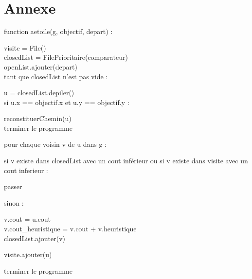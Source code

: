 \documentclass[a4paper, 11pt]{report}
\begin{document}
\newpage
\section*{Annexe}
function aetoile(g, objectif, depart) :
\begin{indented}[1.5cm]
    visite = File()\\
    closedList = FilePrioritaire(comparateur) \\
    openList.ajouter(depart) \\
    tant que closedList n'est pas vide :
    \begin{indented}[1.5cm]
        u = closedList.depiler()\\
        si u.x == objectif.x et u.y == objectif.y :
        \begin{indented}[1.5cm]
            reconstituerChemin(u)\\
            terminer le programme
        \end{indented}
        pour chaque voisin v de u dans g :
        \begin{indented}[1.5cm]
            si v existe dans closedList avec un cout inférieur ou si v existe dans visite avec un cout inferieur :
            \begin{indented}[1.5cm]
                passer
            \end{indented}
            sinon :
            \begin{indented}[1.5cm]
                v.cout = u.cout\\
                v.cout\_heuristique = v.cout + v.heuristique\\
                closedList.ajouter(v)
            \end{indented}
        \end{indented}
        visite.ajouter(u) 
    \end{indented}
    \indent terminer le programme
\end{indented}
\end{document}
